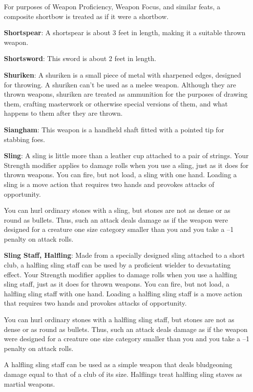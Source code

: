 For purposes of Weapon Proficiency, Weapon Focus, and similar feats, a composite shortbow is treated as if it were a shortbow.
		
\textbf{Shortspear}: A shortspear is about 3 feet in length, making it a suitable thrown weapon.
		
\textbf{Shortsword}: This sword is about 2 feet in length.
		
\textbf{Shuriken}: A shuriken is a small piece of metal with sharpened edges, designed for throwing. A shuriken can't be used as a melee weapon. Although they are thrown weapons, shuriken are treated as ammunition for the purposes of drawing them, crafting masterwork or otherwise special versions of them, and what happens to them after they are thrown.
		
\textbf{Siangham}: This weapon is a handheld shaft fitted with a pointed tip for stabbing foes.
		
\textbf{Sling}: A sling is little more than a leather cup attached to a pair of strings. Your Strength modifier applies to damage rolls when you use a sling, just as it does for thrown weapons. You can fire, but not load, a sling with one hand. Loading a sling is a move action that requires two hands and provokes attacks of opportunity.
		
You can hurl ordinary stones with a sling, but stones are not as dense or as round as bullets. Thus, such an attack deals damage as if the weapon were designed for a creature one size category smaller than you and you take a --1 penalty on attack rolls.
		
\textbf{Sling Staff, Halfling}: Made from a specially designed sling attached to a short club, a halfling sling staff can be used by a proficient wielder to devastating effect. Your Strength modifier applies to damage rolls when you use a halfling sling staff, just as it does for thrown weapons. You can fire, but not load, a halfling sling staff with one hand. Loading a halfling sling staff is a move action that requires two hands and provokes attacks of opportunity.
		
 You can hurl ordinary stones with a halfling sling staff, but stones are not as dense or as round as bullets. Thus, such an attack deals damage as if the weapon were designed for a creature one size category smaller than you and you take a --1 penalty on attack rolls.
		
A halfling sling staff can be used as a simple weapon that deals bludgeoning damage equal to that of a club of its size. Halflings treat halfling sling staves as martial weapons.
		
